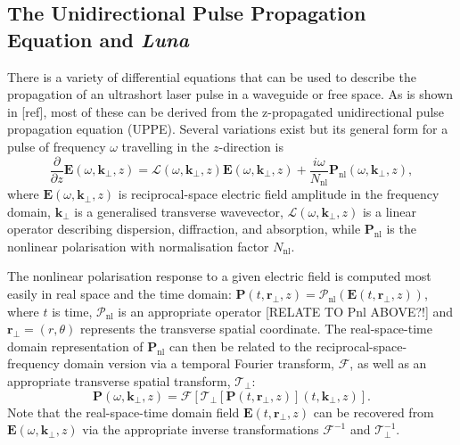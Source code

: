\documentclass[a4paper]{jpconf}
\begin{document}
\subsection{The Unidirectional Pulse Propagation Equation and \emph{Luna} }
There is a variety of differential equations that can be used to describe the propagation of an ultrashort laser pulse in a waveguide or free space. As is shown in [ref], most of these can be derived from the z-propagated unidirectional pulse propagation equation (UPPE). Several variations exist but its general form for a pulse of frequency $\omega$ travelling in the $z$-direction is 
\begin{equation}
\frac{\partial}{\partial z} \mathbf{E}(\omega, \mathbf{k}_\perp, z)= \mathcal{L}(\omega, \mathbf{k}_\perp, z)\mathbf{E}(\omega, \mathbf{k}_\perp, z) + \frac{i \omega}{N_{\text{nl}}} \mathbf{P}_\text{nl}(\omega, \mathbf{k}_\perp, z),
\end{equation}
where $\mathbf{E}(\omega, \mathbf{k}_\perp, z)$ is reciprocal-space electric field amplitude in the frequency domain, $\mathbf{k}_\perp$ is a generalised transverse wavevector,  $\mathcal{L}(\omega, \mathbf{k}_\perp, z)$ is a linear operator describing dispersion, diffraction, and absorption, while $\mathbf{P}_\text{nl}$ is the nonlinear polarisation with normalisation factor $N_\text{nl}$. \par 
The nonlinear polarisation response to a given electric field is computed most easily in real space and the time domain: $\mathbf{P}(t, \mathbf{r}_\perp,z) = \mathcal{P}_\text{nl}(\mathbf{E}(t,\mathbf{r}_\perp,z))$, where $t$ is time, $\mathcal{P}_\text{nl}$ is an appropriate operator [RELATE TO Pnl ABOVE?!] and $\mathbf{r}_\perp = (r, \theta)$ represents the transverse spatial coordinate. The real-space-time domain representation of $\mathbf{P}_\text{nl}$ can then be related to the reciprocal-space-frequency domain version via a temporal Fourier transform, $\mathcal{F}$, as well as an appropriate transverse spatial transform, $\mathcal{T}_\perp$:
\begin{equation}
\mathbf{P}(\omega, \mathbf{k}_\perp,z) = \mathcal{F}\left[ \mathcal{T}_\perp \left[ \mathbf{P}(t, \mathbf{r}_\perp,z) \right](t, \mathbf{k}_\perp, z)  \right]. 
\end{equation}
Note that the real-space-time domain field $\mathbf{E}(t, \mathbf{r}_\perp, z)$ can be recovered from $\mathbf{E}(\omega, \mathbf{k}_\perp, z)$ via the appropriate inverse transformations $\mathcal{F}^{-1}$ and $\mathcal{T}^{-1}_\perp$. \par 
\end{document}

